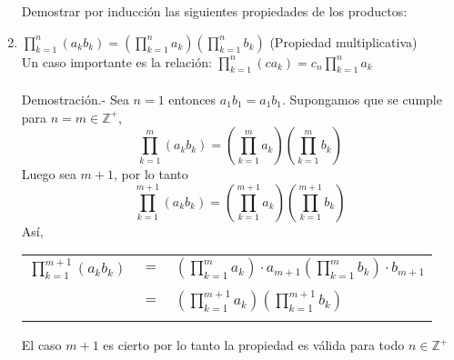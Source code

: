 \begin{enumerate}[ \bfseries 1.]
Demostrar por inducción las siguientes propiedades de los productos:
\item $\displaystyle \prod_{k=1}^n (a_k b_k) = \left( \prod_{k=1}^n a_k \right) \left( \prod_{k=1}^n b_k \right)$ (Propiedad multiplicativa)\\
Un caso importante es la relación: $\displaystyle\prod_{k=1}^n (ca_k) = c_n \prod_{k=1}^n a_k$\\\\
Demostración.- \; Sea $n=1$ entonces $a_1 b_1 = a_1 b_1$. Supongamos que se cumple para $n = m \in \mathbb{Z}^+$, $$\prod\limits_{k=1}^m (a_k b_k) = \left( \prod\limits_{k=1}^m a_k \right) \left( \prod\limits_{k=1}^m b_k \right)$$
Luego sea $m+1$, por lo tanto $$\prod\limits_{k=1}^{m+1} (a_k b_k) = \left( \prod\limits_{k=1}^{m+1} a_k \right) \left( \prod\limits_{k=1}^{m+1} b_k \right)$$
Así, \\
\begin{center}
\begin{tabular}{r c l}
$\prod\limits_{k=1}^{m+1} (a_k b_k)$&$=$&$\left( \prod\limits_{k=1}^m a_k \right) \cdot a_{m+1} \left( \prod\limits_{k=1}^m b_k \right) \cdot b_{m+1}$\\\\
&$=$&$\left( \prod\limits_{k=1}^{m+1} a_k \right) \left( \prod\limits_{k=1}^{m+1} b_k \right)$\\\\
\end{tabular}
\end{center}
El caso $m+1$ es cierto por lo tanto la propiedad es válida para todo $n\in \mathbb{Z}^+$\\\\


\end{enumerate}
